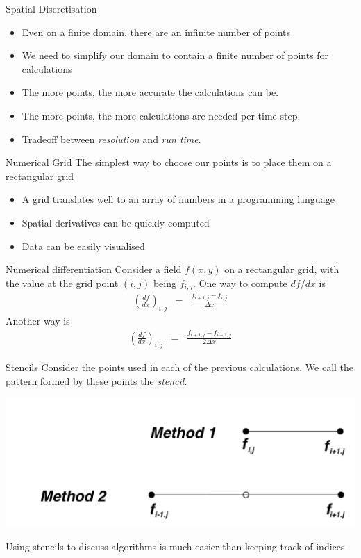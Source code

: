 \documentclass[a4paper]{beamer}
\begin{document}
\begin{frame}{Spatial Discretisation}
\begin{itemize}
\item Even on a finite domain, there are an infinite number of points
\item We need to simplify our domain to contain a finite number of points for calculations
\item The more points, the more accurate the calculations can be.
\item The more points, the more calculations are needed per time step.
\item Tradeoff between \emph{resolution} and \emph{run time}.
\end{itemize}
\end{frame}

\begin{frame}{Numerical Grid}
The simplest way to choose our points is to place them on a rectangular grid
\begin{itemize}
\item A grid translates well to an array of numbers in a programming language
\item Spatial derivatives can be quickly computed
\item Data can be easily visualised
\end{itemize}
\end{frame}

\begin{frame}{Numerical differentiation}
Consider a field $f(x,y)$ on a rectangular grid, with the value at the grid point $(i,j)$ being $f_{i,j}$.
One way to compute $df/dx$ is
\begin{eqnarray}
\left(\frac{df}{dx}\right)_{i,j} & = & \frac{f_{i+1,j} - f_{i,j}}{\Delta x}
\end{eqnarray}
Another way is
\begin{eqnarray}
\left(\frac{df}{dx}\right)_{i,j} & = & \frac{f_{i+1,j} - f_{i-1,j}}{2\Delta x}
\end{eqnarray}
\end{frame}

\begin{frame}{Stencils}
Consider the points used in each of the previous calculations.
We call the pattern formed by these points the \emph{stencil}.
\begin{center}
  \includegraphics[width=\textwidth,height=0.5\textheight,keepaspectratio]{stencil1.png}
\end{center}
Using stencils to discuss algorithms is much easier than keeping track of indices.
\end{frame}
\end{document}
